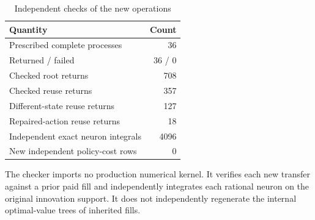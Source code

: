 \begin{table}[htbp]
\centering
\caption{Independent checks of the new operations}\label{tab:audit-summary72}
{\small\setlength{\tabcolsep}{4pt}
\begin{tabular}{lr}
\hline
Quantity & Count \\
\hline
Prescribed complete processes & 36 \\
Returned / failed & 36 / 0 \\
Checked root returns & 708 \\
Checked reuse returns & 357 \\
Different-state reuse returns & 127 \\
Repaired-action reuse returns & 18 \\
Independent exact neuron integrals & 4096 \\
New independent policy-cost rows & 0 \\
\hline
\end{tabular}}
\par\smallskip
{\footnotesize The checker imports no production numerical kernel. It verifies each new transfer against a prior paid fill and independently integrates each rational neuron on the original innovation support. It does not independently regenerate the internal optimal-value trees of inherited fills.}
\end{table}
